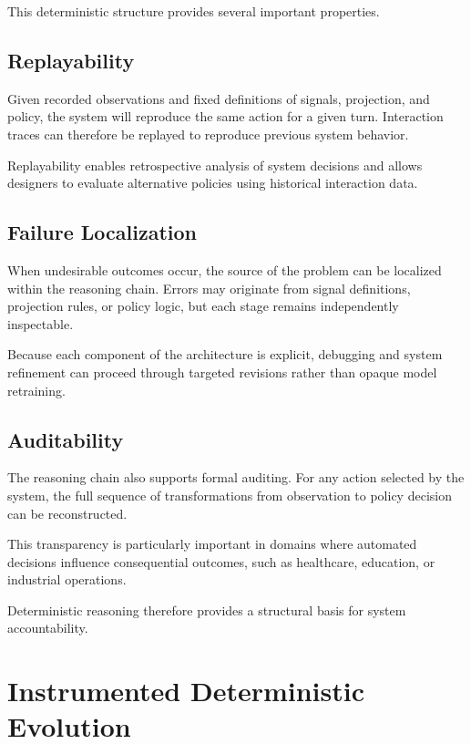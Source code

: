\documentclass[11pt]{article}
\begin{document}
This deterministic structure provides several important properties.

\subsection{Replayability}

Given recorded observations and fixed definitions of signals, projection, and policy, the system will reproduce the same action for a given turn. Interaction traces can therefore be replayed to reproduce previous system behavior.

Replayability enables retrospective analysis of system decisions and allows designers to evaluate alternative policies using historical interaction data.

\subsection{Failure Localization}

When undesirable outcomes occur, the source of the problem can be localized within the reasoning chain. Errors may originate from signal definitions, projection rules, or policy logic, but each stage remains independently inspectable.

Because each component of the architecture is explicit, debugging and system refinement can proceed through targeted revisions rather than opaque model retraining.

\subsection{Auditability}

The reasoning chain also supports formal auditing. For any action selected by the system, the full sequence of transformations from observation to policy decision can be reconstructed.

This transparency is particularly important in domains where automated decisions influence consequential outcomes, such as healthcare, education, or industrial operations.

Deterministic reasoning therefore provides a structural basis for system accountability.




\section{Instrumented Deterministic Evolution}
\end{document}
